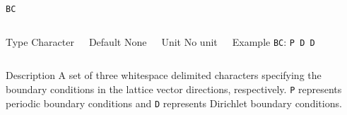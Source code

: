 \documentclass[xcolor=dvipsnames,t]{beamer}
\begin{document}
\begin{frame}[allowframebreaks]{\texttt{BC}} \label{BC}
\vspace*{-12pt}
\begin{columns}
\begin{block}{Type}
Character
\end{block}

\begin{block}{Default}
None
\end{block}

\begin{block}{Unit}
No unit
\end{block}

\begin{block}{Example}
\texttt{BC}: \texttt{P D D}
\end{block}
\end{columns}

\begin{block}{Description}
A set of three whitespace delimited characters specifying the boundary conditions in the lattice vector directions, respectively. \texttt{P} represents periodic boundary conditions and \texttt{D} represents Dirichlet boundary conditions.
\end{block}

\end{frame}
\end{document}
